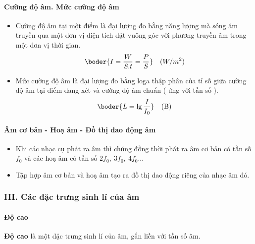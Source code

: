 \paragraph{Cường độ âm. Mức cường độ âm}
\begin{itemize}
\item Cường độ âm  tại một điểm là đại lượng đo bằng năng lượng mà sóng âm truyền qua một đơn vị diện tích đặt vuông góc với phương truyền âm trong một đơn vị thời gian. 
\begin{align*}
\boder{I=\dfrac{W}{S.t}=\dfrac{P}{S}}\quad (W/m^2)
\end{align*}
\item Mức cường độ âm  là đại lượng đo bằng loga thập phân của tỉ số giữa cường độ âm  tại điểm đang xét và cường độ âm chuẩn  ( ứng với tần số ). 
\begin{align*}
\boder{L=\lg\dfrac{I}{I_0}}\quad (\mathrm{B})
\end{align*}
\end{itemize}
\paragraph{Âm cơ bản - Hoạ âm - Đồ thị dao động âm}
\begin{itemize}
\item Khi các nhạc cụ phát ra âm thì chúng đồng thời phát ra âm cơ bản có tần số $f_0$ và các hoạ âm có tần số $2f_0,\ 3f_0,\ 4f_0...$
\item Tập hợp âm cơ bản và hoạ âm tạo ra đồ thị dao động riêng của nhạc âm đó. 
\end{itemize}
\subsubsection*{III. Các đặc trưng sinh lí của âm}
\setcounter{paragraph}{0}
\paragraph{Độ cao}
\textbf{Độ cao} là một đặc trưng sinh lí của âm, gắn liền với tần số âm.
